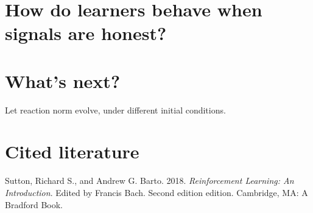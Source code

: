\documentclass[
]{article}
\begin{document}
\hypertarget{how-do-learners-behave-when-signals-are-honest}{%
\section{How do learners behave when signals are
honest?}\label{how-do-learners-behave-when-signals-are-honest}}

\hypertarget{whats-next}{%
\section{What's next?}\label{whats-next}}

Let reaction norm evolve, under different initial conditions.

\hypertarget{cited-literature}{%
\section*{Cited literature}\label{cited-literature}}

\hypertarget{refs}{}
\leavevmode\hypertarget{ref-sutton_reinforcement_2018}{}%
Sutton, Richard S., and Andrew G. Barto. 2018. \emph{Reinforcement
Learning: An Introduction}. Edited by Francis Bach. Second edition
edition. Cambridge, MA: A Bradford Book.
\end{document}
